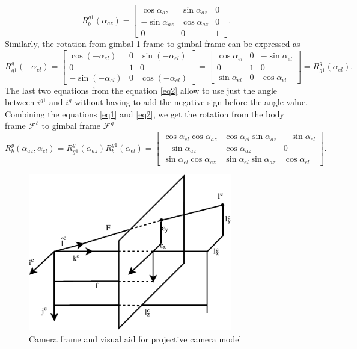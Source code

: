 \begin{equation}
R^{g1}_b(\alpha_{az}) = \begin{bmatrix}
\cos\alpha_{az} & \sin\alpha_{az} & 0 \\
-\sin\alpha_{az} & \cos\alpha_{az} & 0 \\
0 & 0 & 1
\end{bmatrix}.
\label{eq1}
\end{equation}
Similarly, the rotation from gimbal-1 frame to gimbal frame can be expressed as 
\begin{equation}
R^g_{g1}(-\alpha_{el}) = \begin{bmatrix}
\cos(-\alpha_{el}) &  0 & \sin(-\alpha_{el})\\
0 & 1 & 0 \\
-\sin(-\alpha_{el}) & 0 & \cos(-\alpha_{el})
\end{bmatrix}
= \begin{bmatrix}
\cos\alpha_{el} &  0 & -\sin\alpha_{el}\\
0 & 1 & 0 \\
\sin\alpha_{el} & 0 & \cos\alpha_{el}
\end{bmatrix} = R^g_{g1}(\alpha_{el}).
\label{eq2}
\end{equation}
The last two equations from the equation \ref{eq2} allow to use just the angle between $i^{g1}$ and $i^{g}$ without having to add the negative sign before the angle value. 
Combining the equations \ref{eq1} and \ref{eq2}, we get the rotation from the body frame $\mathcal{F}^b$ to gimbal frame $\mathcal{F}^{g}$ 
\begin{equation}
R^{g}_b(\alpha_{az}, \alpha_{el}) = R^g_{g1}(\alpha_{az})R^{g1}_b(\alpha_{el}) =
\begin{bmatrix}
\cos\alpha_{el}\cos\alpha_{az} & \cos\alpha_{el}\sin\alpha_{az} & -\sin\alpha_{el} \\
-\sin\alpha_{az} & \cos\alpha_{az} & 0 \\
\sin\alpha_{el}\cos\alpha_{az} & \sin\alpha_{el}\sin\alpha_{az} & \cos\alpha_{el}
\end{bmatrix}.
\label{eq3}
\end{equation}

\begin{figure}[t]
	\centering
	\includegraphics[width = 3.5in]{images/chapter2/camera_frame}
	\caption{Camera frame and visual aid for projective camera model}
	\label{camera_frame}
\end{figure}


